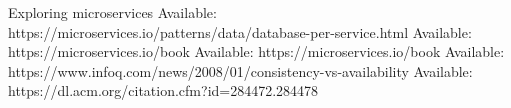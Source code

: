 \documentclass[conference]{IEEEtran}
\begin{document}
%
%
%
\begin{thebibliography}{1}

Exploring microservices
Available: https://microservices.io/patterns/data/database-per-service.html
Available: https://microservices.io/book
Available: https://microservices.io/book
Available: https://www.infoq.com/news/2008/01/consistency-vs-availability
Available: https://dl.acm.org/citation.cfm?id=284472.284478

\end{thebibliography}




\end{document}
